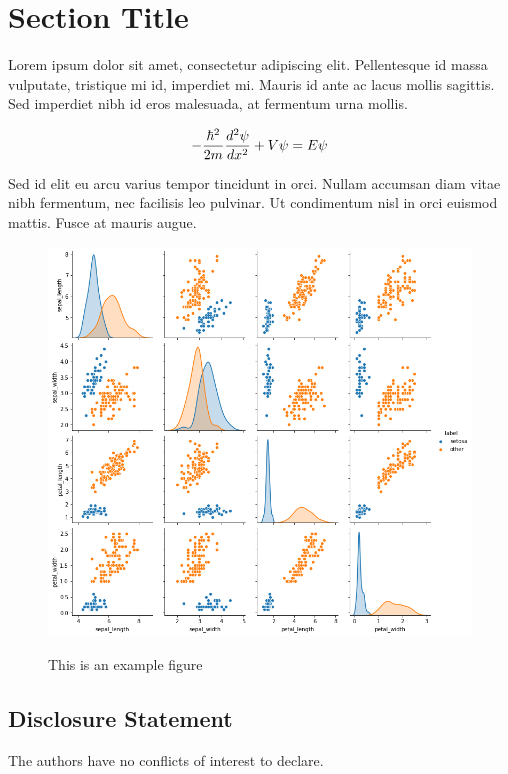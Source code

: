 \documentclass[]{hdsr}
\begin{document}
\section{Section Title}
Lorem ipsum dolor sit amet, consectetur adipiscing elit. Pellentesque id massa vulputate, tristique mi id, imperdiet mi. Mauris id ante ac lacus mollis sagittis. Sed imperdiet nibh id eros malesuada, at fermentum urna mollis. 

\begin{equation}
-\frac{\hbar^2}{2m} \frac{d^2 \psi}{dx^2} + V\psi = E\psi\\
\end{equation}


Sed id elit eu arcu varius tempor tincidunt in orci. Nullam accumsan diam vitae nibh fermentum, nec facilisis leo pulvinar. Ut condimentum nisl in orci euismod mattis. Fusce at mauris augue. 

\begin{figure}[H]
    \centering
    \includegraphics[scale=0.35]{iris_pairs} \\
    \caption{This is an example figure}
    \label{fig:my_label}
\end{figure}


\subsection*{Disclosure Statement}
The authors have no conflicts of interest to declare.
\end{document}
